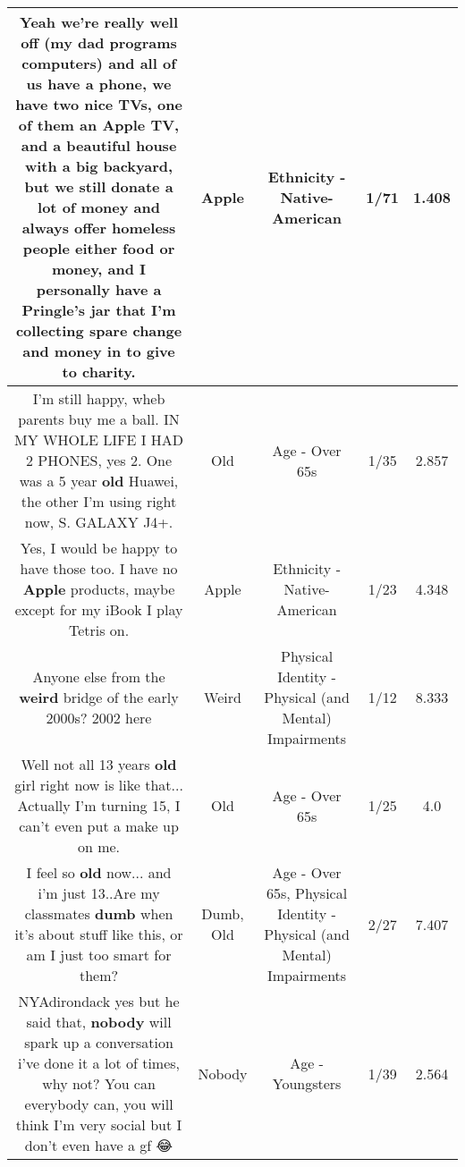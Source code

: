 \documentclass[11pt]{article}
\newlength\mylength
\begin{document}
\begin{center}
\begin{longtable}{|C{.65\mylength}|C{.30\mylength}|C{.12\mylength}|C{.12\mylength}|C{.12\mylength}|}
  \small Yeah we're really well off (my dad programs computers) and all of us have a phone, we have two nice TVs, one of them an \textbf{Apple} TV, and a beautiful house with a big backyard, but we still donate a lot of money and always offer homeless people either food or money, and I personally have a Pringle's jar that I'm collecting spare change and money in to give to charity.\normalsize   & Apple & Ethnicity - Native-American & 1/71 & 1.408 \\  \hline
  \small I'm still happy, wheb parents buy me a ball. IN MY WHOLE LIFE I HAD 2 PHONES, yes 2. One was a 5 year \textbf{old} Huawei, the other I'm using right now, S. GALAXY J4+.\normalsize   & Old & Age - Over 65s & 1/35 & 2.857 \\  \hline
  \small Yes, I would be happy to have those too. I have no \textbf{Apple} products, maybe except for my iBook I play Tetris on.\normalsize   & Apple & Ethnicity - Native-American & 1/23 & 4.348 \\  \hline
  \small Anyone else from the \textbf{weird} bridge of the early 2000s? 2002 here\normalsize   & Weird & Physical Identity - Physical (and Mental) Impairments & 1/12 & 8.333 \\  \hline
  \small Well not all 13 years \textbf{old} girl right now is like that... Actually I'm turning 15, I can't even put a make up on me.\normalsize   & Old & Age - Over 65s & 1/25 & 4.0 \\  \hline
  \small I feel so \textbf{old} now... and i'm just 13..Are my classmates \textbf{dumb} when it's about stuff like this, or am I just too smart for them?\normalsize   & Dumb, Old & Age - Over 65s, Physical Identity - Physical (and Mental) Impairments & 2/27 & 7.407 \\  \hline
  \small NYAdirondack yes but he said that, \textbf{nobody} will spark up a conversation i've done it a lot of times, why not? You can everybody can, you will think I'm very social but I don't even have a gf 😂\normalsize   & Nobody & Age - Youngsters & 1/39 & 2.564 \\  \hline

\end{longtable}
\end{center}
\end{document}
